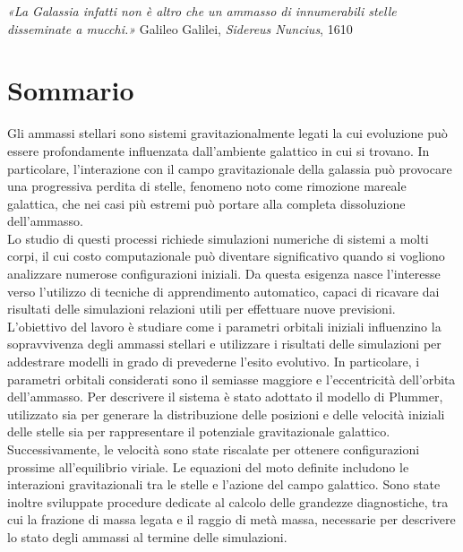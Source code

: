 \begin{flushright}
	\textit{«La Galassia infatti non è altro che un ammasso
		di innumerabili stelle disseminate a mucchi.»}
	\vspace{0.2cm}
	Galileo Galilei, \textit{Sidereus Nuncius}, 1610
\end{flushright}

\vspace{0.5cm}
{}

\chapter*{Sommario} %
\label{sommario}
Gli ammassi stellari sono sistemi gravitazionalmente legati la cui evoluzione può essere profondamente influenzata dall'ambiente galattico in cui si trovano. In particolare, l'interazione con il campo gravitazionale della galassia può provocare una progressiva perdita di stelle, fenomeno noto come rimozione mareale galattica, che nei casi più estremi può portare alla completa dissoluzione dell'ammasso.\\
Lo studio di questi processi richiede simulazioni numeriche di sistemi a molti corpi, il cui costo computazionale può diventare significativo quando si vogliono analizzare numerose configurazioni iniziali.
Da questa esigenza nasce l'interesse verso l'utilizzo di tecniche di apprendimento automatico, capaci di ricavare dai risultati delle simulazioni relazioni utili per effettuare nuove previsioni.\\

\noindent L'obiettivo del lavoro è studiare come i parametri orbitali iniziali influenzino la sopravvivenza degli ammassi stellari e utilizzare i risultati delle simulazioni per addestrare modelli in grado di prevederne l'esito evolutivo. In particolare, i parametri orbitali considerati sono il semiasse maggiore e l'eccentricità dell'orbita dell'ammasso. Per descrivere il sistema è stato adottato il modello di Plummer, utilizzato sia per generare la distribuzione delle posizioni e delle velocità iniziali delle stelle sia per rappresentare il potenziale gravitazionale galattico. Successivamente, le velocità sono state riscalate per ottenere configurazioni prossime all'equilibrio viriale. Le equazioni del moto definite includono le interazioni gravitazionali tra le stelle e l'azione del campo galattico. Sono state inoltre sviluppate procedure dedicate al calcolo delle grandezze diagnostiche, tra cui la frazione di massa legata e il raggio di metà massa, necessarie per descrivere lo stato degli ammassi al termine delle simulazioni.\\


